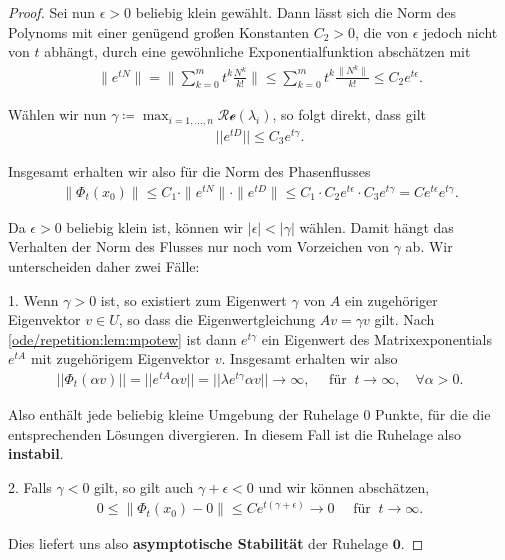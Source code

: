\documentclass[letterpaper,10pt,english]{jupyterBook}
\begin{document}
\begin{proof}
\par
Sei nun \(\epsilon > 0\) beliebig klein gewählt.
Dann lässt sich die Norm des Polynoms mit einer genügend großen Konstanten \(C_2 > 0\), die von \(\epsilon\) jedoch nicht von \(t\) abhängt, durch eine gewöhnliche Exponentialfunktion abschätzen mit
\begin{align*}
 \|e^{tN}\| = \| \sum_{k=0}^m t^k\frac{N^k}{k!} \| \leq \sum_{k=0}^m t^k \frac{\|N^k\|}{k!} \leq C_2  e^{t \epsilon}.
\end{align*}
\par
Wählen wir nun \(\gamma \coloneqq \max_{i=1,\dots,n} \mathcal{Re}(\lambda_i)\), so folgt direkt, dass gilt
\begin{align*}
||e^{tD}|| \leq C_3 e^{t\gamma}.
\end{align*}
\par
Insgesamt erhalten wir also für die Norm des Phasenflusses
\begin{align}\label{equation:odestability/ruhelagen:eq:abschaetzungew}
\|\Phi_t(x_0)\| \leq C_1 \cdot \|e^{tN}\| \cdot \|e^{tD}\| \leq C_1 \cdot C_2 e^{t \epsilon} \cdot C_3 e^{t\gamma} = C e^{t \epsilon} e^{t\gamma}.
\end{align}
\par
Da \(\epsilon > 0\) beliebig klein ist, können wir \(|\epsilon| < |\gamma|\) wählen.
Damit hängt das Verhalten der Norm des Flusses nur noch vom Vorzeichen von \(\gamma\) ab.
Wir unterscheiden daher zwei Fälle:

\par
1. Wenn \(\gamma >0\) ist, so existiert zum Eigenwert \(\gamma\) von \(A\) ein zugehöriger Eigenvektor \(v\in U\), so dass die Eigenwertgleichung \(A v = \gamma v\) gilt.
Nach \cref{ode/repetition:lem:mpotew} ist dann \(e^{t\gamma}\) ein Eigenwert des Matrixexponentials \(e^{tA}\) mit zugehörigem Eigenvektor \(v\).
Insgesamt erhalten wir also
\begin{align*}
||\Phi_t(\alpha v)|| = ||e^{tA}\alpha v|| = ||\lambda e^{t\gamma} \alpha v|| \to \infty, \quad \text{ für } \ t \to \infty, \quad  \forall \alpha>0.\end{align*}
\par
Also enthält jede beliebig kleine Umgebung der Ruhelage \(0\) Punkte, für die die entsprechenden Lösungen divergieren.
In diesem Fall ist die Ruhelage also \textbf{instabil}.

\par
2. Falls \(\gamma <0\) gilt, so gilt auch \(\gamma + \epsilon <0\) und wir können abschätzen,
\begin{align*}
0\leq \|\Phi_t(x_0)-0\|\leq C e^{t (\gamma + \epsilon)} \to 0 \quad \text{ für } \ t \to \infty.
\end{align*}
\par
Dies liefert uns also \textbf{asymptotische Stabilität} der Ruhelage \(\mathbf{0}\).
\end{proof}
\end{document}

